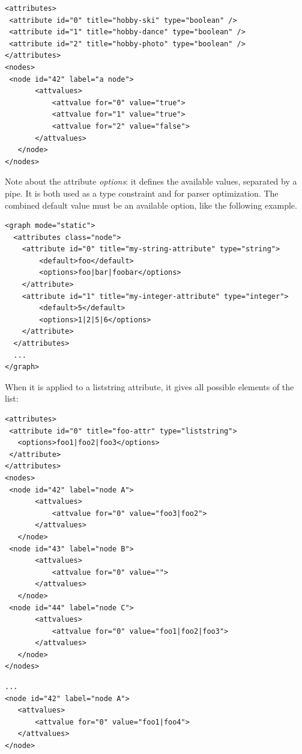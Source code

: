 \documentclass[a4paper,10pt]{article}
\begin{document}
\lstset{ style=gexf }
\begin{lstlisting}[caption={Liststring version},label=liststringVersion]
<attributes>
 <attribute id="0" title="hobby-ski" type="boolean" />
 <attribute id="1" title="hobby-dance" type="boolean" />
 <attribute id="2" title="hobby-photo" type="boolean" />
</attributes>
<nodes>
 <node id="42" label="a node">
       <attvalues>
           <attvalue for="0" value="true">
           <attvalue for="1" value="true">
           <attvalue for="2" value="false">
       </attvalues>
   </node>
</nodes>
\end{lstlisting}


Note about the attribute \textit{options}: it defines the available values, separated by a pipe. It is both used as a type constraint and for parser optimization. The combined default value must be an available option, like the following example.

\lstset{ style=gexf }
\begin{lstlisting}[caption={Options},label=optionsDef]
<graph mode="static">
  <attributes class="node">
    <attribute id="0" title="my-string-attribute" type="string">
        <default>foo</default>
        <options>foo|bar|foobar</options>
    </attribute>
    <attribute id="1" title="my-integer-attribute" type="integer">
        <default>5</default>
        <options>1|2|5|6</options>
    </attribute>
  </attributes>
  ...
</graph>
\end{lstlisting}

When it is applied to a liststring attribute, it gives all possible elements of the list:

\lstset{ style=gexf }
\begin{lstlisting}[caption={Valid values},label=validVal]
<attributes>
 <attribute id="0" title="foo-attr" type="liststring">
   <options>foo1|foo2|foo3</options>
 </attribute>
</attributes>
<nodes>
 <node id="42" label="node A">
       <attvalues>
           <attvalue for="0" value="foo3|foo2">
       </attvalues>
   </node>
 <node id="43" label="node B">
       <attvalues>
           <attvalue for="0" value="">
       </attvalues>
   </node>
 <node id="44" label="node C">
       <attvalues>
           <attvalue for="0" value="foo1|foo2|foo3">
       </attvalues>
   </node>
</nodes>
\end{lstlisting}

\lstset{ style=gexf }
\begin{lstlisting}[caption={Invalid values},label=invalidVal]
...
<node id="42" label="node A">
   <attvalues>
       <attvalue for="0" value="foo1|foo4">
   </attvalues>
</node>
\end{lstlisting}
\end{document}
